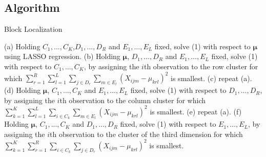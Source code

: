 \documentclass{article}
\begin{document}
\begin{appendices}
	\section{Algorithm}
	\begin{algorithm}
		\caption{Block Localization}
		\label{alg:B}
		\begin{algorithmic}
			\REPEAT 
			\STATE (a) Holding $C_1,...,C_K$,$D_1,...,D_R$ and $E_1,...,E_L$ fixed, solve (1) with respect to $\mathbf{\mu}$ using LASSO regression.
			\STATE (b) Holding  $\mathbf{\mu}$, $D_1,...,D_R$ and $E_1,...,E_L$ fixed, solve (1) with respect to $C_1,...,C_K$, by assigning the $i$th observation to the row cluster for which $\sum_{r=1}^R\sum_{l=1}^L\sum_{j\in D_r}\sum_{m\in E_l}(X_{ijm}-\mu_{krl})^2$ is smallest.
			\STATE (c) repeat (a).
			\STATE (d) Holding  $\mathbf{\mu}$, $C_1,...,C_K$ and $E_1,...,E_L$ fixed, solve (1) with respect to $D_1,...,D_R$, by assigning the $i$th observation to the column cluster for which $\sum_{k=1}^K\sum_{l=1}^L\sum_{i\in C_k}\sum_{m\in E_l}(X_{ijm}-\mu_{krl})^2$ is smallest.
			\STATE (e) repeat (a).
			\STATE (f) Holding  $\mathbf{\mu}$, $C_1,...,C_K$ and $D_1,...,D_R$ fixed, solve (1) with respect to $E_1,...,E_L$, by assigning the $i$th observation to the cluster of the third dimension for which $\sum_{k=1}^K\sum_{r=1}^R\sum_{i\in C_k}\sum_{j\in D_r}(X_{ijm}-\mu_{krl})^2$ is smallest.
		\end{algorithmic}
	\end{algorithm}

\end{appendices}
\end{document}
